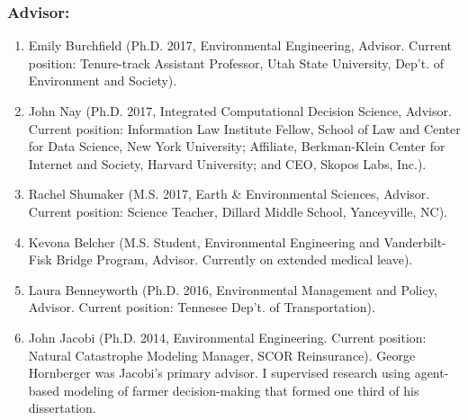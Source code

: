 \documentclass[10pt]{article}
\begin{document}
    \subsubsection{Advisor:}
    \begin{enumerate}
    \item Emily Burchfield (Ph.D. 2017, Environmental Engineering, Advisor. Current position: Tenure-track Assistant Professor, Utah State University, Dep't. of Environment and Society).
    \item John Nay (Ph.D. 2017, Integrated Computational Decision Science, Advisor. Current position: Information Law Institute Fellow, School of Law and Center for Data Science, New York University; Affiliate, Berkman-Klein Center for Internet and Society, Harvard University; and CEO, Skopos Labs, Inc.).
    \item Rachel Shumaker (M.S. 2017, Earth \& Environmental Sciences, Advisor. Current position: Science Teacher, Dillard Middle School, Yanceyville, NC).
    \item Kevona Belcher (M.S. Student, Environmental Engineering and Vanderbilt-Fisk Bridge Program, Advisor. Currently on extended medical leave).
    \item Laura Benneyworth (Ph.D. 2016, Environmental Management and Policy, Advisor. Current position: Tennesee Dep't. of Transportation).
    \item John Jacobi (Ph.D. 2014, Environmental Engineering. Current position: Natural Catastrophe Modeling Manager, SCOR Reinsurance). George Hornberger was Jacobi's primary advisor. I supervised research using agent-based modeling of farmer decision-making that formed one third of his dissertation.
    \end{enumerate}
\end{document}
